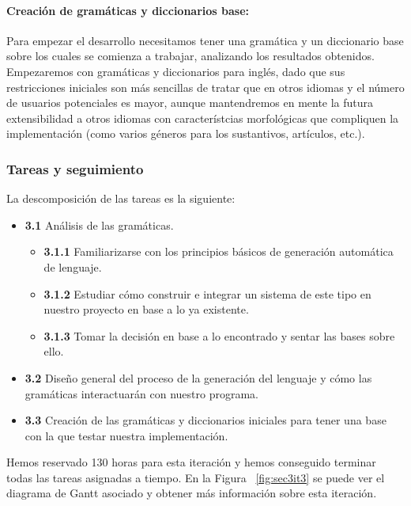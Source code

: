 \paragraph{Creación de gramáticas y diccionarios base:} Para empezar el desarrollo necesitamos tener una gramática y un diccionario base sobre los cuales se comienza a trabajar, analizando los resultados obtenidos. Empezaremos con gramáticas y diccionarios para inglés, dado que sus restricciones iniciales son más sencillas de tratar que en otros idiomas y el número de usuarios potenciales es mayor, aunque mantendremos en mente la futura extensibilidad a otros idiomas con característcias morfológicas que compliquen la implementación (como varios géneros para los sustantivos, artículos, etc.).

\subsubsection{Tareas y seguimiento}

La descomposición de las tareas es la siguiente:

\begin{itemize}[label=\bfseries WBS 3.\arabic*]
  \item \textbf{3.1} Análisis de las gramáticas.
    \begin{itemize}[label=\bfseries WBS 3.1.\arabic*]
      \item \textbf{3.1.1} Familiarizarse con los principios básicos de generación automática de lenguaje.
      \item \textbf{3.1.2} Estudiar cómo construir e integrar un sistema de este tipo en nuestro proyecto en base a lo ya existente.
      \item \textbf{3.1.3} Tomar la decisión en base a lo encontrado y sentar las bases sobre ello.
    \end{itemize}
  \item \textbf{3.2} Diseño general del proceso de la generación del lenguaje y cómo las gramáticas interactuarán con nuestro programa.
  \item \textbf{3.3} Creación de las gramáticas y diccionarios iniciales para tener una base con la que testar nuestra implementación.
\end{itemize}

\noindent Hemos reservado 130 horas para esta iteración y hemos conseguido terminar todas las tareas asignadas a tiempo. En la Figura ~\ref{fig:sec3it3} se puede ver el diagrama de Gantt asociado y obtener más información sobre esta iteración.

